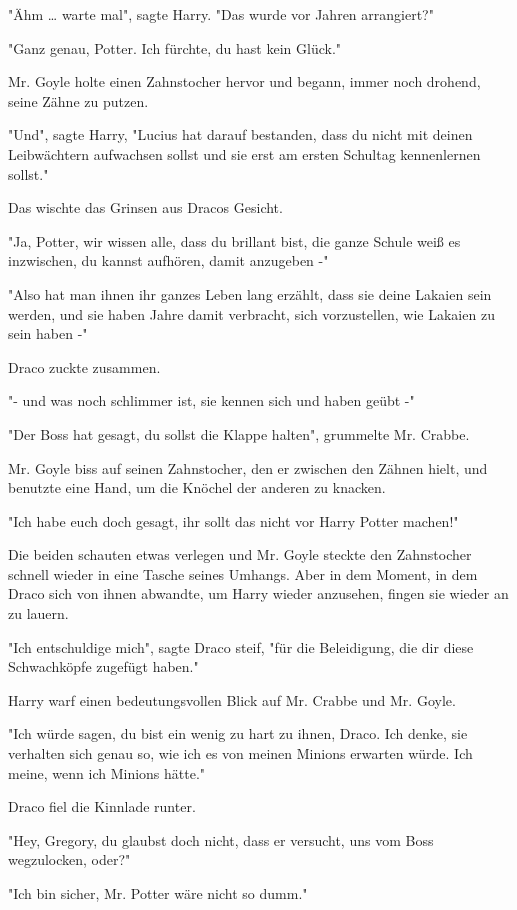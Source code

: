 {"Ähm … warte mal", sagte Harry. "Das wurde vor Jahren arrangiert?"

"Ganz genau, Potter. Ich fürchte, du hast kein Glück."

Mr. Goyle holte einen Zahnstocher hervor und begann, immer noch drohend, seine Zähne zu putzen.

"Und", sagte Harry, "Lucius hat darauf bestanden, dass du nicht mit deinen Leibwächtern aufwachsen sollst und sie erst am ersten Schultag kennenlernen sollst."

Das wischte das Grinsen aus Dracos Gesicht.

"Ja, Potter, wir wissen alle, dass du brillant bist, die ganze Schule weiß es inzwischen, du kannst aufhören, damit anzugeben -"

"Also hat man ihnen ihr ganzes Leben lang erzählt, dass sie deine Lakaien sein werden, und sie haben Jahre damit verbracht, sich vorzustellen, wie Lakaien zu sein haben -"

Draco zuckte zusammen.

"- und was noch schlimmer ist, sie kennen sich und haben geübt -"

"Der Boss hat gesagt, du sollst die Klappe halten", grummelte Mr. Crabbe.

Mr. Goyle biss auf seinen Zahnstocher, den er zwischen den Zähnen hielt, und benutzte eine Hand, um die Knöchel der anderen zu knacken.

"Ich habe euch doch gesagt, ihr sollt das nicht vor Harry Potter machen!"

Die beiden schauten etwas verlegen und Mr. Goyle steckte den Zahnstocher schnell wieder in eine Tasche seines Umhangs. Aber in dem Moment, in dem Draco sich von ihnen abwandte, um Harry wieder anzusehen, fingen sie wieder an zu lauern.

"Ich entschuldige mich", sagte Draco steif, "für die Beleidigung, die dir diese Schwachköpfe zugefügt haben."

Harry warf einen bedeutungsvollen Blick auf Mr. Crabbe und Mr. Goyle.

"Ich würde sagen, du bist ein wenig zu hart zu ihnen, Draco. Ich denke, sie verhalten sich genau so, wie ich es von meinen Minions erwarten würde. Ich meine, wenn ich Minions hätte."

Draco fiel die Kinnlade runter.

"Hey, Gregory, du glaubst doch nicht, dass er versucht, uns vom Boss wegzulocken, oder?"

"Ich bin sicher, Mr. Potter wäre nicht so dumm."

}

